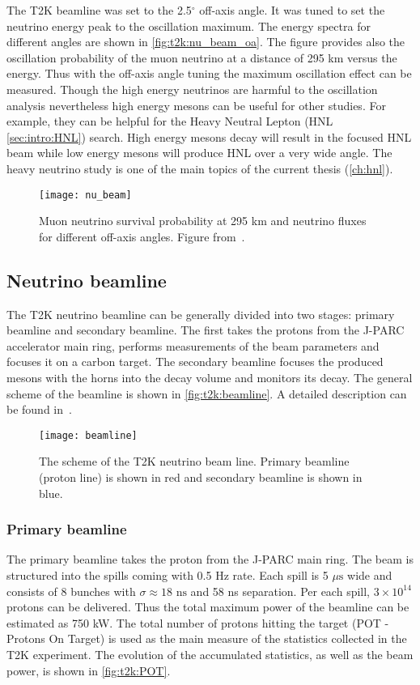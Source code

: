 \documentclass[../main.tex]{subfiles}
\begin{document}
The T2K beamline was set to the 2.5${}^\circ$ off-axis angle. It was tuned to set the neutrino energy peak to the oscillation maximum. The energy spectra for different angles are shown in \autoref{fig:t2k:nu_beam_oa}. The figure provides also the oscillation probability of the muon neutrino at a distance of 295 km versus the energy. Thus with the off-axis angle tuning the maximum oscillation effect can be measured. Though the high energy neutrinos are harmful to the oscillation analysis nevertheless high energy mesons can be useful for other studies. For example, they can be helpful for the Heavy Neutral Lepton (HNL \autoref{sec:intro:HNL}) search. High energy mesons decay will result in the focused HNL beam while low energy mesons will produce HNL over a very wide angle. The heavy neutrino study is one of the main topics of the current thesis (\autoref{ch:hnl}).

\begin{figure}[!ht]
  \centering
  \texttt{[image: nu\_beam]}
  \caption{Muon neutrino survival probability at 295 km and neutrino fluxes for different off-axis angles. Figure from~\cite{Abe2013}.}
  \label{fig:t2k:nu_beam_oa}
\end{figure}

\subsection{Neutrino beamline}
The T2K neutrino beamline can be generally divided into two stages: primary beamline and secondary beamline. The first takes the protons from the J-PARC accelerator main ring, performs measurements of the beam parameters and focuses it on a carbon target. The secondary beamline focuses the produced mesons with the horns into the decay volume and monitors its decay. The general scheme of the beamline is shown in \autoref{fig:t2k:beamline}. A detailed description can be found in~\cite{Abe2013}.

\begin{figure}[!ht]
  \centering
  \texttt{[image: beamline]}
  \caption{The scheme of the T2K neutrino beam line. Primary beamline (proton line) is shown in red and secondary beamline is shown in blue.}
  \label{fig:t2k:beamline}
\end{figure}

\subsubsection{Primary beamline}
The primary beamline takes the proton from the J-PARC main ring. The beam is structured into the spills coming with 0.5 Hz rate. Each spill is 5 $\mu\text{s}$ wide and consists of 8 bunches with $\sigma\approx18 \text{ ns}$ and 58 ns separation. Per each spill, $3\times10^{14}$ protons can be delivered. Thus the total maximum power of the beamline can be estimated as 750 kW. The total number of protons hitting the target (POT - Protons On Target) is used as the main measure of the statistics collected in the T2K experiment. The evolution of the accumulated statistics, as well as the beam power, is shown in \autoref{fig:t2k:POT}.
\end{document}
